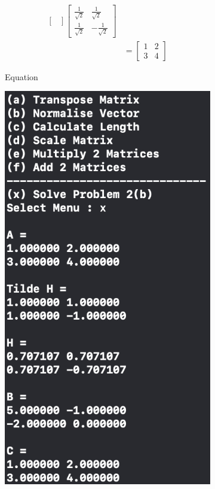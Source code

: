 \begin{figure}[h]
\begin{subfigure}[b]{0.4\textwidth}
\begin {align*}
\begin{bmatrix}
        \end{bmatrix}\begin{bmatrix}
            \frac{1}{\sqrt{2}}&\frac{1}{\sqrt{2}}\\
            \frac{1}{\sqrt{2}}&-\frac{1}{\sqrt{2}}
        \end{bmatrix}\\
        &=\begin{bmatrix}
            1&2\\3&4
        \end{bmatrix}
        \end {align*}
        \caption{Equation}
        \label{fig:equation}
    \end{subfigure}
    \hfill
    \begin{subfigure}[b]{0.5\textwidth}
        \centering
        \includegraphics[width=\textwidth]{img/prj0/x.png}

\end{subfigure}
\end{figure}
